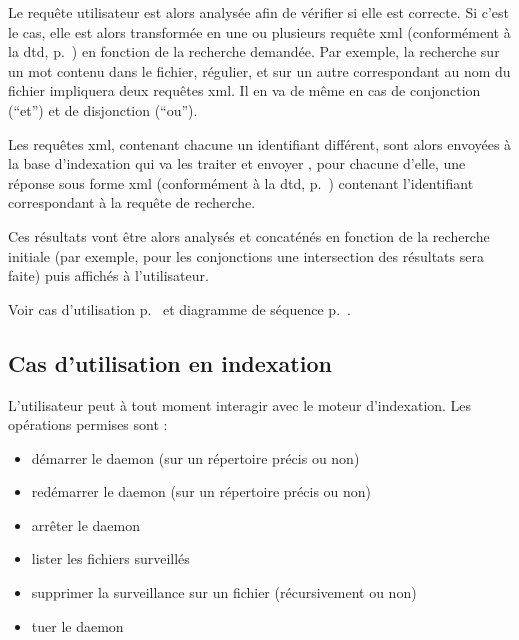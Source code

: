\documentclass[a4paper,12pt]{report}
\begin{document}
Le requête utilisateur est alors analysée afin de vérifier si elle est correcte. Si c'est le cas, elle est alors transformée en une ou plusieurs requête \gls{xml} (conformément à la \gls{dtd}, p.~\pageref{dtd_bi_mr_search}) en fonction de la recherche demandée. Par exemple, la recherche sur un mot contenu dans le fichier, régulier, et sur un autre correspondant au nom du \gls{fichier} impliquera deux requêtes \gls{xml}. Il en va de même en cas de conjonction (\enquote{et}) et de disjonction (\enquote{ou}).

Les requêtes \gls{xml}, contenant chacune un identifiant différent, sont alors envoyées à la base d'indexation qui va les traiter et envoyer , pour chacune d'elle, une réponse sous forme \gls{xml} (conformément à la \gls{dtd}, p.~\pageref{dtd_bi_mr_result}) contenant l'identifiant correspondant à la requête de recherche.

Ces résultats vont être alors analysés et concaténés en fonction de la recherche initiale (par exemple, pour les conjonctions une intersection des résultats sera faite) puis affichés à l'utilisateur.

Voir cas d'utilisation p.~\pageref{utilisation-recherche} et diagramme de séquence p.~\pageref{sequence-recherche}.

\subsection{Cas d'utilisation en indexation}
L'utilisateur peut à tout moment interagir avec le moteur d'indexation. Les opérations permises sont :
\begin{itemize}
\item démarrer le \gls{daemon} (sur un répertoire précis ou non)
\item redémarrer le \gls{daemon} (sur un répertoire précis ou non)
\item arrêter le \gls{daemon}
\item lister les \glspl{fichier} surveillés
\item supprimer la surveillance sur un \gls{fichier} (récursivement ou non)
\item tuer le \gls{daemon}
\end{itemize}
\end{document}
